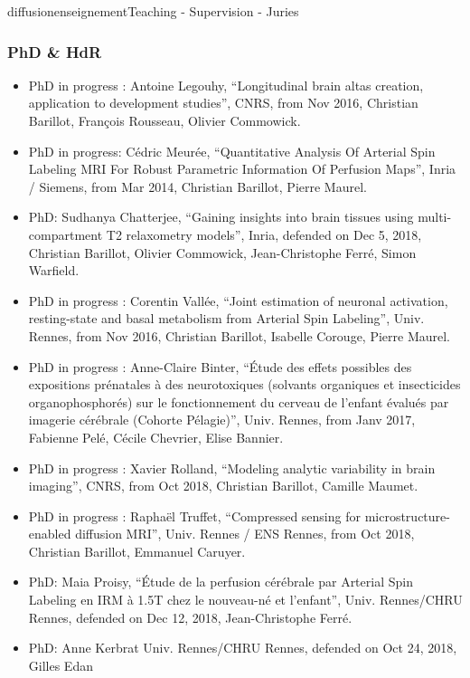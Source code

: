 \documentclass{ra2018}
\begin{document}
\begin{module}{diffusion}{enseignement}{Teaching - Supervision - Juries}
 \subsubsection{PhD \& HdR}
 \begin{itemize}
           \item PhD in progress : Antoine Legouhy, ``Longitudinal brain altas creation, application to development studies'', CNRS, from Nov 2016, Christian Barillot, François Rousseau, Olivier Commowick.
           \item PhD in progress: Cédric Meurée, ``Quantitative Analysis Of Arterial Spin Labeling MRI For Robust Parametric Information Of Perfusion Maps'', Inria / Siemens, from Mar 2014, Christian Barillot, Pierre Maurel.
	   \item PhD: Sudhanya Chatterjee, ``Gaining insights into brain tissues using multi-compartment T2 relaxometry models'', Inria, defended on Dec 5, 2018, Christian Barillot, Olivier Commowick, Jean-Christophe Ferré, Simon Warfield.
           \item PhD in progress : Corentin Vallée, ``Joint estimation of neuronal activation, resting-state and basal metabolism from Arterial Spin Labeling'', Univ. Rennes, from Nov 2016, Christian Barillot, Isabelle Corouge, Pierre Maurel.
           \item PhD in progress : Anne-Claire Binter, ``Étude des effets possibles des expositions prénatales à des neurotoxiques (solvants organiques et insecticides organophosphorés) sur le fonctionnement du cerveau de l’enfant évalués par imagerie cérébrale (Cohorte Pélagie)'', Univ. Rennes, from Janv 2017, Fabienne Pelé, Cécile Chevrier, Elise Bannier.
           \item PhD in progress : Xavier Rolland, ``Modeling analytic variability in brain imaging'', CNRS, from Oct 2018, Christian Barillot, Camille Maumet.
           \item PhD in progress : Raphaël Truffet, ``Compressed sensing for microstructure-enabled diffusion MRI'', Univ. Rennes / ENS Rennes, from Oct 2018, Christian Barillot, Emmanuel Caruyer.
  	   \item PhD: Maia Proisy, ``Étude de la perfusion cérébrale par Arterial Spin Labeling en IRM à 1.5T chez le nouveau-né et l'enfant'', Univ. Rennes/CHRU Rennes, defended on Dec 12, 2018, Jean-Christophe Ferré. 
	   \item PhD: Anne Kerbrat Univ. Rennes/CHRU Rennes, defended on Oct 24, 2018, Gilles Edan
  \end{itemize}


\end{module}
\end{document}

